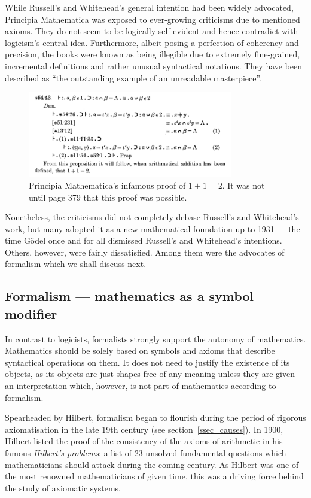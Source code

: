\documentclass[hidelinks]{article}
\begin{document}
While Russell's and Whitehead's general intention had been widely advocated, Principia Mathematica was exposed to ever-growing criticisms due to mentioned axioms. They do not seem to be logically self-evident and hence contradict with logicism's central idea. Furthermore, albeit posing a perfection of coherency and precision, the books were known as being illegible due to extremely fine-grained, incremental definitions and rather unusual syntactical notations. They have been described as ``the outstanding example of an unreadable masterpiece''\cite[p.~154]{math_experience}.

\begin{figure}[h]
	\centering
	\includegraphics[width=0.8\textwidth]{img/principia_mathematica.png}
	\caption{Principia Mathematica's infamous proof of $1+1=2$. It was not until page 379 that this proof was possible.}
\end{figure}

Nonetheless, the criticisms did not completely debase Russell's and Whitehead's work, but many adopted it as a new mathematical foundation up to 1931 --- the time Gödel once and for all dismissed Russell's and Whitehead's intentions. Others, however, were fairly dissatisfied. Among them were the advocates of formalism which we shall discuss next.

\subsection{Formalism --- mathematics as a symbol modifier}\label{ssec_formalism}
In contrast to logicists, formalists strongly support the autonomy of mathematics. 
Mathematics should be solely based on symbols and axioms that describe syntactical operations on them. It does not need to justify the existence of its objects, as its objects are just shapes free of any meaning unless they are given an interpretation which, however, is not part of mathematics according to formalism.

Spearheaded by Hilbert, formalism began to flourish during the period of rigorous axiomatisation in the late 19th century (see section~\ref{ssec_causes}). 
In 1900, Hilbert listed the proof of the consistency of the axioms of arithmetic in his famous \textit{Hilbert's problems}: a list of 23 unsolved fundamental questions which mathematicians should attack during the coming century. As Hilbert was one of the most renowned mathematicians of given time, this was a driving force behind the study of axiomatic systems.
\end{document}
